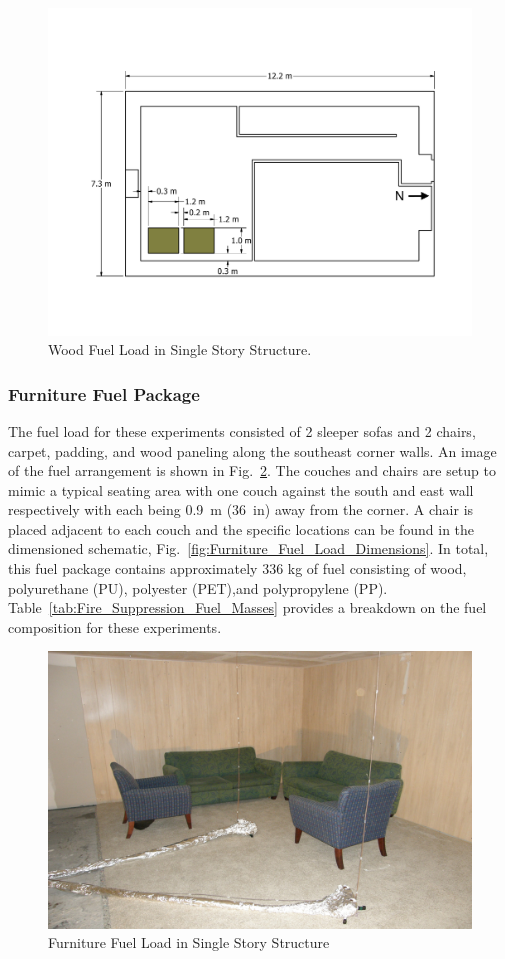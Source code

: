 \documentclass[12pt,oneside]{book}
\begin{document}
\begin{figure}[!ht]
	\includegraphics[width=.8\columnwidth]{../Figures/Floor_Plans/PDFs/East_Structure/DelCo_2012_East_Structure_Pallets}
	\caption{Wood Fuel Load in Single Story Structure.}
	\label{fig:Wood_Fuel_Load_Dimensions}
\end{figure}

\subsubsection{Furniture Fuel Package}
\label{sec:fire_suppression_furniture_fuel}

The fuel load for these experiments consisted of 2 sleeper sofas and 2 chairs, carpet, padding, and wood paneling along the southeast corner walls. An image of the fuel arrangement is shown in Fig.~\ref{fig:Furniture_Fuel_Load}. The couches and chairs are setup to mimic a typical seating area with one couch against the south and east wall respectively with each being 0.9~m (36~in) away from the corner. A chair is placed adjacent to each couch and the specific locations can be found in the dimensioned schematic, Fig.~\ref{fig:Furniture_Fuel_Load_Dimensions}. In total, this fuel package contains approximately 336 kg of fuel consisting of wood, polyurethane (PU), polyester (PET),and polypropylene (PP). Table~\ref{tab:Fire_Suppression_Fuel_Masses} provides a breakdown on the fuel composition for these experiments.

\begin{figure}[!ht]
	\includegraphics[width=.8\columnwidth]{../Figures/Pictures/Furniture_Fuel_Load}
	\caption{Furniture Fuel Load in Single Story Structure}
	\label{fig:Furniture_Fuel_Load}
\end{figure}
\end{document}
